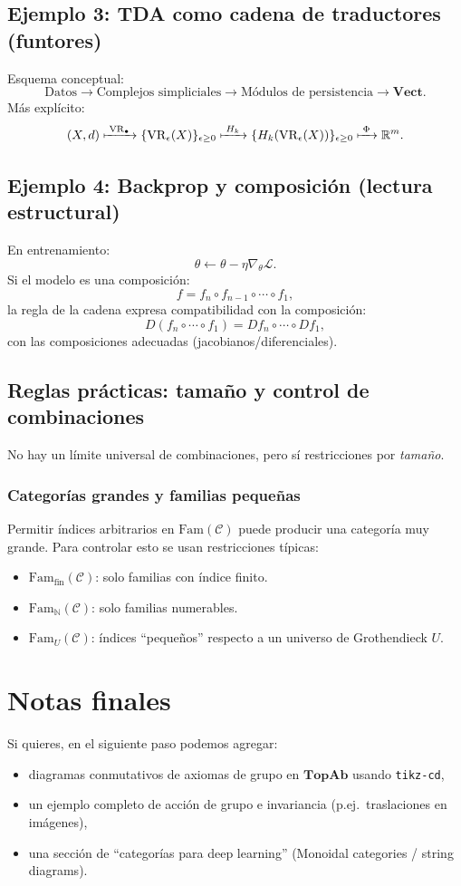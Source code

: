 \documentclass[12pt,oneside]{book}
\theoremstyle{definition}
\begin{document}
\section{Ejemplo 3: TDA como cadena de traductores (funtores)}
Esquema conceptual:
\[
\text{Datos}
\longrightarrow
\text{Complejos simpliciales}
\longrightarrow
\text{Módulos de persistencia}
\longrightarrow
\mathbf{Vect}.
\]
Más explícito:
\[
(X,d)
\xmapsto{\;\mathrm{VR}_\bullet\;}
\{\mathrm{VR}_\epsilon(X)\}_{\epsilon\ge 0}
\xmapsto{\;H_k\;}
\{H_k(\mathrm{VR}_\epsilon(X))\}_{\epsilon\ge 0}
\xmapsto{\;\Phi\;}
\mathbb{R}^m.
\]

\section{Ejemplo 4: Backprop y composición (lectura estructural)}
En entrenamiento:
\[
\theta \leftarrow \theta - \eta \nabla_{\theta}\mathcal{L}.
\]
Si el modelo es una composición:
\[
f=f_n\circ f_{n-1}\circ\cdots\circ f_1,
\]
la regla de la cadena expresa compatibilidad con la composición:
\[
D(f_n\circ\cdots\circ f_1)=Df_n\circ\cdots\circ Df_1,
\]
con las composiciones adecuadas (jacobianos/diferenciales).

\section{Reglas prácticas: tamaño y control de combinaciones}
No hay un límite universal de combinaciones, pero sí restricciones por \emph{tamaño}.

\subsection{Categorías grandes y familias pequeñas}
Permitir índices arbitrarios en $\mathrm{Fam}(\mathcal{C})$ puede producir una categoría
muy grande. Para controlar esto se usan restricciones típicas:
\begin{itemize}[leftmargin=1.5em]
  \item $\mathrm{Fam}_{\mathrm{fin}}(\mathcal{C})$: solo familias con índice finito.
  \item $\mathrm{Fam}_{\mathbb{N}}(\mathcal{C})$: solo familias numerables.
  \item $\mathrm{Fam}_{U}(\mathcal{C})$: índices ``pequeños'' respecto a un universo de Grothendieck $U$.
\end{itemize}

\backmatter
\chapter*{Notas finales}
Si quieres, en el siguiente paso podemos agregar:
\begin{itemize}[leftmargin=1.5em]
  \item diagramas conmutativos de axiomas de grupo en $\mathbf{TopAb}$ usando \texttt{tikz-cd},
  \item un ejemplo completo de acción de grupo e invariancia (p.ej.\ traslaciones en imágenes),
  \item una sección de ``categorías para deep learning'' (Monoidal categories / string diagrams).
\end{itemize}
\end{document}
